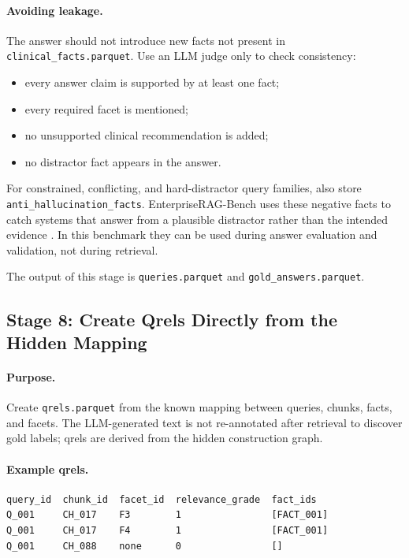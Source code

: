 \documentclass[11pt,a4paper]{article}
\newcommand{\field}[1]{\texttt{#1}}
\newcommand{\stage}[2]{\subsection{\textcolor{betterblue}{#1}: #2}}
\begin{document}
\paragraph{Avoiding leakage.}
The answer should not introduce new facts not present in \field{clinical\_facts.parquet}. Use an LLM judge only to check consistency:

\begin{itemize}[leftmargin=*]
	\item every answer claim is supported by at least one fact;
	\item every required facet is mentioned;
	\item no unsupported clinical recommendation is added;
	\item no distractor fact appears in the answer.
\end{itemize}

For constrained, conflicting, and hard-distractor query families, also store \field{anti\_hallucination\_facts}. EnterpriseRAG-Bench uses these negative facts to catch systems that answer from a plausible distractor rather than the intended evidence \citep{sun2026enterpriseragbench}. In this benchmark they can be used during answer evaluation and validation, not during retrieval.

The output of this stage is \field{queries.parquet} and \field{gold\_answers.parquet}.

\stage{Stage 8}{Create Qrels Directly from the Hidden Mapping}

\paragraph{Purpose.}
Create \field{qrels.parquet} from the known mapping between queries, chunks, facts, and facets. The LLM-generated text is not re-annotated after retrieval to discover gold labels; qrels are derived from the hidden construction graph.

\paragraph{Example qrels.}

\begin{lstlisting}[style=promptstyle]
query_id  chunk_id  facet_id  relevance_grade  fact_ids
Q_001     CH_017    F3        1                [FACT_001]
Q_001     CH_017    F4        1                [FACT_001]
Q_001     CH_088    none      0                []
\end{lstlisting}
\end{document}
